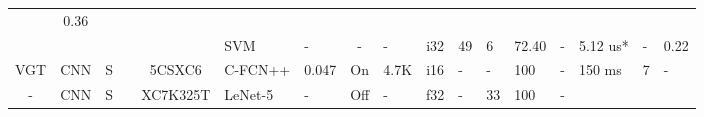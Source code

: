 \begin{table}
\begin{adjustbox}{totalheight=\baselineskip,}
\begin{tabular}{ccccclp{2em}cp{3em}cp{2em}p{4em}p{3em}p{3.5em}p{3.5em}p{2.5em}p{3em}}
                                                               &\multirow{1}{*}{0.36}\\
   &   &   &   &   &\multirow{1}{*}{SVM}
                       &\multirow{1}{*}{-}
                           &\multirow{1}{*}{-}
                               &\multirow{1}{*}{-}
                                   &\multirow{1}{*}{i32}
                                       &\multirow{1}{*}{49}
                                           &\multirow{1}{*}{6}
                                               &\multirow{1}{*}{72.40}
                                                   &\multirow{1}{*}{-}
                                                       &\multirow{1}{*}{5.12 us*}
                                                           &\multirow{1}{*}{-}
                                                               &\multirow{1}{*}{0.22}\\
\cmidrule{1-17}
\multirow{1}{*}{VGT}
   &\multirow{1}{*}{CNN}
       &\multirow{1}{*}{S}
           &\multirow{1}{*}{\cite{bahlLowpowerNeuralNetworks2019a}}
               &\multirow{1}{*}{5CSXC6}
                   &\multirow{1}{*}{C-FCN++}
                       &\multirow{1}{*}{0.047}
                           &\multirow{1}{*}{On}
                               &\multirow{1}{*}{4.7K}
                                   &\multirow{1}{*}{i16}
                                       &\multirow{1}{*}{-}
                                           &\multirow{1}{*}{-}
                                               &\multirow{1}{*}{100}
                                                   &\multirow{1}{*}{-}
                                                       &\multirow{1}{*}{150 ms}
                                                           &\multirow{1}{*}{7}
                                                               &\multirow{1}{*}{-}\\
\cmidrule{1-17}
\multirow{7}{*}{-}
   &\multirow{5}{*}{CNN}
       &\multirow{1}{*}{S}
           &\multirow{1}{*}{\cite{chenHardwareImplementationConvolutional2020}}
               &\multirow{1}{*}{XC7K325T}
                   &\multirow{1}{*}{LeNet-5}
                       &\multirow{1}{*}{-}
                           &\multirow{1}{*}{Off}
                               &\multirow{1}{*}{-}
                                   &\multirow{1}{*}{f32}
                                       &\multirow{1}{*}{-}
                                           &\multirow{1}{*}{33}
                                               &\multirow{1}{*}{100}
                                                   &\multirow{1}{*}{-}

\end{tabular}
\end{adjustbox}
\end{table}
